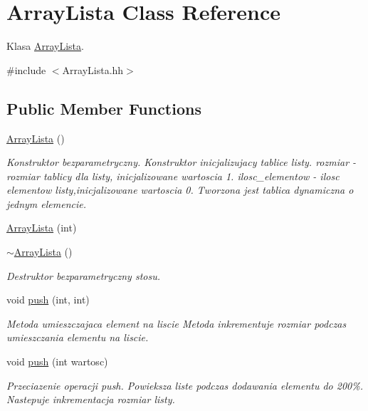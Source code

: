 \hypertarget{a00001}{}\section{Array\+Lista Class Reference}
\label{a00001}


Klasa \hyperlink{a00001}{Array\+Lista}.  




{\ttfamily \#include $<$Array\+Lista.\+hh$>$}

\subsection*{Public Member Functions}
\begin{DoxyCompactItemize}
\item 
\hyperlink{a00001_a645d18dcf43d2f3397d0ba90f5d8d0b4}{Array\+Lista} ()
\begin{DoxyCompactList}\small\item\em Konstruktor bezparametryczny. Konstruktor inicjalizujacy tablice listy. rozmiar -\/ rozmiar tablicy dla listy, inicjalizowane wartoscia 1. ilosc\+\_\+elementow -\/ ilosc elementow listy,inicjalizowane wartoscia 0. Tworzona jest tablica dynamiczna o jednym elemencie. \end{DoxyCompactList}\item 
\hyperlink{a00001_a0bf8b1be3beb5a7783df8fe555e24e6c}{Array\+Lista} (int)
\item 
\hyperlink{a00001_ab502f9c0ea71ec66954ebe675100b9ce}{$\sim$\+Array\+Lista} ()
\begin{DoxyCompactList}\small\item\em Destruktor bezparametryczny stosu. \end{DoxyCompactList}\item 
void \hyperlink{a00001_a473a71ed888097c7b14bb70cbf7eecd6}{push} (int, int)
\begin{DoxyCompactList}\small\item\em Metoda umieszczajaca element na liscie Metoda inkrementuje rozmiar podczas umieszczania elementu na liscie. \end{DoxyCompactList}\item 
void \hyperlink{a00001_a1d194e2d2e54114ef939d7fe64508840}{push} (int wartosc)
\begin{DoxyCompactList}\small\item\em Przeciazenie operacji push. Powieksza liste podczas dodawania elementu do 200\%. Nastepuje inkrementacja rozmiar listy. \end{DoxyCompactList}\item 

\end{DoxyCompactItemize}
